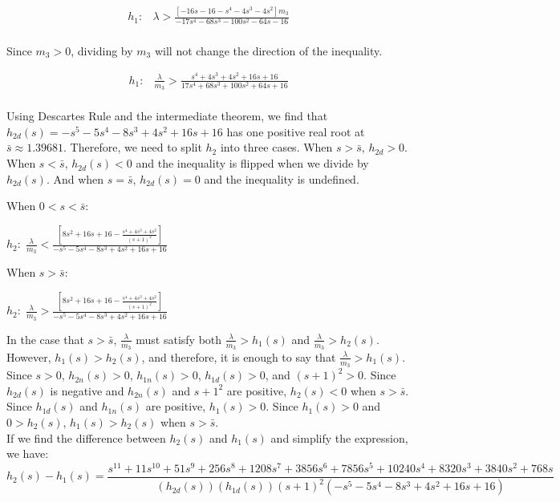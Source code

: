 \documentclass[11pt,leqno]{article}
\theoremstyle{definition}
\theoremstyle{remark}
\numberwithin{equation}{section}
\begin{document}
\begin{equation}
\begin{array}{ll}
h_{1}: & \lambda>\frac{[-16s-16-s^{4}-4s^{3}-4s^{2}]m_{3}}{-17s^{4}-68s^{3}-100s^{2}-64s-16}\\
\end{array}
\end{equation}

Since $m_{3}>0$, dividing by $m_{3}$ will not change the direction of the inequality.


\begin{equation}
\begin{array}{ll}

h_{1}: & \frac{\lambda}{m_{3}}>\frac{s^{4}+4s^{3}+4s^{2}+16s+16}{17s^{4}+68s^{3}+100s^{2}+64s+16}\\
\end{array}
\end{equation}


Using Descartes Rule and the intermediate theorem, we find that $h_{2d}(s)=-s^{5}-5s^{4}-8s^{3}+4s^{2}+16s+16$ has one positive real root at $\bar{s}\approx1.39681$. Therefore, we need to split $h_2$ into three cases.  When $s>\bar{s}$, $h_{2d}>0$. When $s<\bar{s}$, $h_{2d}(s)<0$ and the inequality is flipped when we divide by $h_{2d}(s)$. And when $s=\bar{s}$, $h_{2d}(s)=0$ and the inequality is undefined.

When $0<s<\bar{s}$:

$h_{2}:\;\frac{\lambda}{m_{3}}<\frac{[8s^{2}+16s+16-\frac{s^{4}+4s^{3}+4s^{2}}{(s+1)^{2}}]}{-s^{5}-5s^{4}-8s^{3}+4s^{2}+16s+16}$

When $s>\bar{s}$:

$h_{2}:\;\frac{\lambda}{m_{3}}>\frac{[8s^{2}+16s+16-\frac{s^{4}+4s^{3}+4s^{2}}{(s+1)^{2}}]}{-s^{5}-5s^{4}-8s^{3}+4s^{2}+16s+16}$

In the case that $s>\bar{s}$, $\frac{\lambda}{m_3}$ must satisfy both $\frac{\lambda}{m_{3}}>h_{1}(s)$ and $\frac{\lambda}{m_{3}}>h_{2}(s)$. However, $h_{1}(s) > h_2(s)$, and therefore, it is enough to say that $\frac{\lambda}{m_{3}}>h_{1}(s)$. Since $s>0$, $h_{2n}(s) > 0$, $h_{1n}(s) >0$, $h_{1d}(s)>0$, and $(s+1)^2>0$. Since $h_{2d}(s)$ is negative and $h_{2n}(s)$ and ${s+1}^2$ are positive, $h_{2}(s)<0$ when $s>\bar{s}$. Since $h_{1d}(s)$ and $h_{1n}(s)$ are positive, $h_1(s)>0$. Since $h_1(s)>0$ and $0>h_2(s)$, $h_1(s)>h_2(s)$ when $s>\bar{s}$. \\

If we find the difference between $h_{2}(s)$ and $h_{1}(s)$ and simplify the expression, we
have: $$h_{2}(s)-h_{1}(s)=\frac{s^{11}+11s^{10}+51s^{9}+256s^{8}+1208s^{7}+3856s^{6}+7856s^{5}+10240s^{4}+8320s^{3}+3840s^{2}+768s}{(h_{2d}(s))(h_{1d}(s))(s+1)^{2}(-s^{5}-5s^{4}-8s^{3}+4s^{2}+16s+16)}$$
\end{document}
